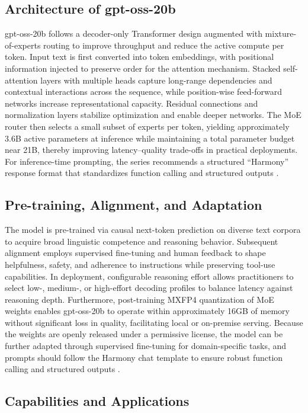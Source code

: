 \subsection{Architecture of gpt-oss-20b}

gpt-oss-20b follows a decoder-only Transformer design augmented with mixture-of-experts routing to improve throughput and reduce the active compute per token. Input text is first converted into token embeddings, with positional information injected to preserve order for the attention mechanism. Stacked self-attention layers with multiple heads capture long-range dependencies and contextual interactions across the sequence, while position-wise feed-forward networks increase representational capacity. Residual connections and normalization layers stabilize optimization and enable deeper networks. The MoE router then selects a small subset of experts per token, yielding approximately 3.6B active parameters at inference while maintaining a total parameter budget near 21B, thereby improving latency–quality trade-offs in practical deployments. For inference-time prompting, the series recommends a structured “Harmony” response format that standardizes function calling and structured outputs \cite{openai2025gptoss}.

\subsection{Pre-training, Alignment, and Adaptation}

The model is pre-trained via causal next-token prediction on diverse text corpora to acquire broad linguistic competence and reasoning behavior. Subsequent alignment employs supervised fine-tuning and human feedback to shape helpfulness, safety, and adherence to instructions while preserving tool-use capabilities. In deployment, configurable reasoning effort allows practitioners to select low-, medium-, or high-effort decoding profiles to balance latency against reasoning depth. Furthermore, post-training MXFP4 quantization of MoE weights enables gpt-oss-20b to operate within approximately 16GB of memory without significant loss in quality, facilitating local or on-premise serving. Because the weights are openly released under a permissive license, the model can be further adapted through supervised fine-tuning for domain-specific tasks, and prompts should follow the Harmony chat template to ensure robust function calling and structured outputs \cite{openai2025gptoss}.

\subsection{Capabilities and Applications}

